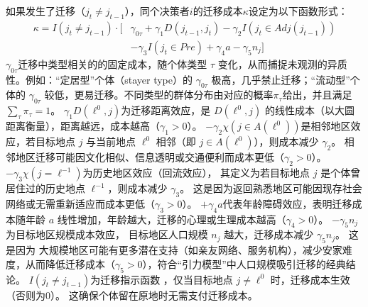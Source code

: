 \documentclass[
  a4paper,
  zihao=-4,
  fontset=mac,
  AutoFakeBold,
  AutoFakeSlant,
  oneside]{ctexbook}
\begin{document}
如果发生了迁移（$j_t \neq j_{t-1}$），同个决策者$i$的迁移成本$\kappa$设定为以下函数形式：
\begin{equation}
\begin{split}
  \kappa=I(j_t \neq j_{t-1}) \cdot [& 
  \gamma_{0 \tau}
  + \gamma_1 D(j_{t-1},j_t)
  - \gamma_2 I(j_t \in Adj(j_{t-1}))
  \\&
  - \gamma_3 I(j_t \in Pre)
  + \gamma_4 a
  -\gamma_5 n_j
  ]
\end{split}
\label{eq:迁移成本函数}
\end{equation}
$\gamma_{0\tau}$迁移中类型相关的的固定成本，随个体类型 $\tau$ 变化，从而捕捉未观测的异质性。例如：“定居型”个体（stayer type）的 $\gamma_{0\tau}$ 极高，几乎禁止迁移；“流动型”个体的 $\gamma_{0\tau}$ 较低，更易迁移。不同类型的群体分布由对应的概率$\pi_\tau$给出，并且满足$\sum\limits_{\tau}^{} \pi_\tau=1$。
$\gamma_1 D(\ell^0, j)$为迁移距离效应，是 $D(\ell^0, j)$ 的线性成本（以大圆距离衡量），距离越远，成本越高（$\gamma_1 > 0$）。  
$-\gamma_2 \chi(j \in A(\ell^0))$是相邻地区效应，若目标地点 $j$ 与当前地点 $\ell^0$ 相邻（即 $j \in A(\ell^0)$），则成本减少 $\gamma_2$。
相邻地区迁移可能因文化相似、信息透明或交通便利而成本更低（$\gamma_2 > 0$）。  
$-\gamma_3 \chi(j = \ell^{-1})$为历史地区效应（回流效应），
其定义为若目标地点 $j$ 是个体曾居住过的历史地点 $\ell^{-1}$，则成本减少 $\gamma_3$。
这是因为返回熟悉地区可能因现存社会网络或无需重新适应而成本更低（$\gamma_3 > 0$）。  
$+\gamma_4 a$代表年龄障碍效应，表明迁移成本随年龄 $a$ 线性增加，年龄越大，迁移的心理或生理成本越高（$\gamma_4 > 0$）。  
$-\gamma_5 n_j$为目标地区规模成本效应，
目标地区人口规模 $n_j$ 越大，迁移成本减少 $\gamma_5 n_j$。  
这是因为
大规模地区可能有更多潜在支持（如亲友网络、服务机构），减少安家难度，从而降低迁移成本（$\gamma_5 > 0$），符合“引力模型”中人口规模吸引迁移的经典结论。  
$I(j_t \neq j_{t-1})$为迁移指示函数 ，仅当目标地点 $j \neq \ell^0$ 时，迁移成本生效（否则为0）。  这确保个体留在原地时无需支付迁移成本。
\end{document}
